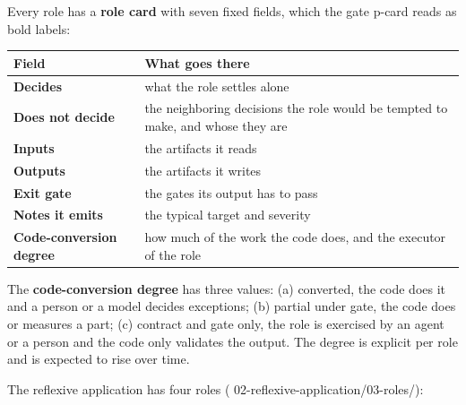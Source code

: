 \documentclass[
  american,
  10pt,
]{report}
\newcounter{none} %
\renewcommand{\texttt}[1]{{\ttfamily\hyphenchar\font=-1 #1}}
\begin{document}
Every role has a \textbf{role card} with seven fixed fields, which the
gate \texttt{p-\allowbreak{}card} reads as bold labels:

{\def\LTcaptype{none} %
\begin{longtable}[]{@{}
  >{\raggedright\arraybackslash}p{}
  >{\raggedright\arraybackslash}p{}@{}}
\toprule\noalign{}
\begin{minipage}[b]{\linewidth}\raggedright
Field
\end{minipage} & \begin{minipage}[b]{\linewidth}\raggedright
What goes there
\end{minipage} \\
\midrule\noalign{}
\endhead
\bottomrule\noalign{}
\endlastfoot
\textbf{Decides} & what the role settles alone \\
\textbf{Does not decide} & the neighboring decisions the role would be
tempted to make, and whose they are \\
\textbf{Inputs} & the artifacts it reads \\
\textbf{Outputs} & the artifacts it writes \\
\textbf{Exit gate} & the gates its output has to pass \\
\textbf{Notes it emits} & the typical target and severity \\
\textbf{Code-conversion degree} & how much of the work the code does,
and the executor of the role \\
\end{longtable}
}

The \textbf{code-conversion degree} has three values: (a) converted, the
code does it and a person or a model decides exceptions; (b) partial
under gate, the code does or measures a part; (c) contract and gate
only, the role is exercised by an agent or a person and the code only
validates the output. The degree is explicit per role and is expected to
rise over time.

The reflexive application has four roles
(\texttt{02-\allowbreak{}reflexive-\allowbreak{}application/\allowbreak{}03-\allowbreak{}roles/\allowbreak{}}):
\end{document}
